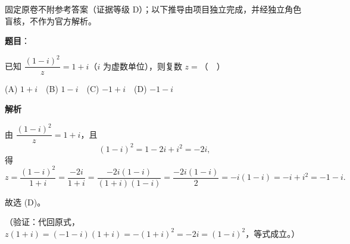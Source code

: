 
\begin{gktip}
固定原卷不附参考答案（证据等级 D）；以下推导由项目独立完成，并经独立角色盲核，不作为官方解析。
\end{gktip}

\begin{answer}

\textbf{题目}：

已知 \(\dfrac{(1-i)^2}{z}=1+i\)（\(i\) 为虚数单位），则复数 \(z=\)（　）\par\smallskip

(A) \(1+i\)　(B) \(1-i\)　(C) \(-1+i\)　(D) \(-1-i\)

\textbf{解析}

由 \(\dfrac{(1-i)^2}{z}=1+i\)，且
\nopagebreak[4]
\[
(1-i)^2=1-2i+i^2=-2i,
\]
得
\nopagebreak[4]
\[
z=\dfrac{(1-i)^2}{1+i}=\dfrac{-2i}{1+i}
=\dfrac{-2i(1-i)}{(1+i)(1-i)}
=\dfrac{-2i(1-i)}{2}
=-i(1-i)=-i+i^2=-1-i.
\]

故选 (D)。

（验证：代回原式，\(z(1+i)=(-1-i)(1+i)=-(1+i)^2=-2i=(1-i)^2\)，等式成立。）


\end{answer}
